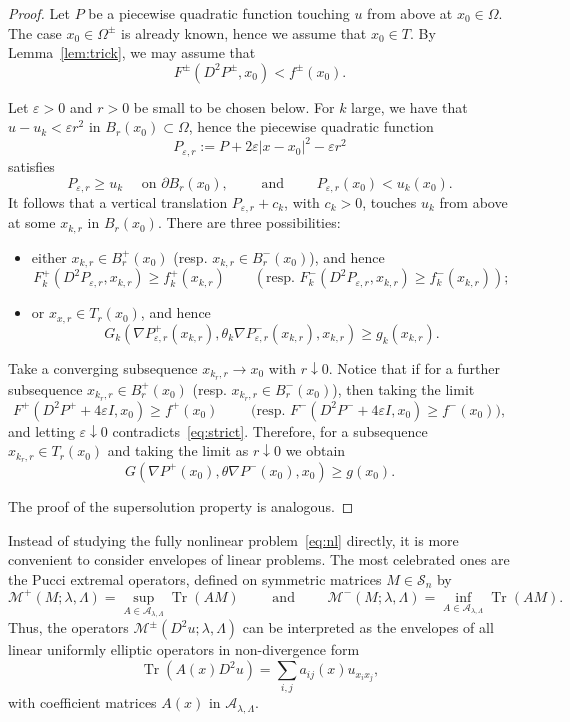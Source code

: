 \documentclass[letter,11pt]{amsart}
\newcommand{\vep}{\varepsilon}
\newcommand{\tr}[1]{\operatorname{Tr}(#1)}
\newcommand{\id}{I}
\newcommand{\ellmat}{\mathcal{A}_{\lambda, \Lambda}}
\newcommand{\mcal}{\mathcal{M}}
\newcommand{\scal}{\mathcal{S}}
\theoremstyle{definition}
\numberwithin{equation}{section}
\begin{document}
\begin{proof}
Let $P$ be a piecewise quadratic function touching $u$ from above at $x_0 \in \Omega$.
The case $x_0 \in \Omega^{\pm}$ is already known, hence we assume that $x_0 \in T$.
By Lemma~\ref{lem:trick}, we may assume that
\begin{equation}
\label{eq:strict}
F^{\pm}(D^2 P^{\pm}, x_0) < f^{\pm}(x_0).
\end{equation}

Let $\vep > 0$ and $r >0$ be small to be chosen below.
For $k$ large, we have that $u - u_k < \vep r^2$ in $B_r(x_0) \subset \Omega$, hence the piecewise quadratic function 
\[
P_{\vep, r} := P + 2 \vep |x-x_0|^2 - \vep r^2
\]
satisfies
\[
P_{\vep,r} \geq u_k \quad \text{ on } \partial B_r(x_0), \qquad \text{ and } \qquad P_{\vep, r}(x_0) < u_k(x_0).
\]
It follows that a vertical translation $P_{\vep,r} + c_k$, with $c_k > 0$, touches $u_k$ from above at some $x_{k,r}$ in $B_r(x_0)$.
There are three possibilities:
\begin{itemize}
\item either $x_{k,r} \in B_r^{+}(x_0)$ (resp. $x_{k,r} \in B_r^{-}(x_0)$), and hence
\[
F_{k}^{+} (D^2 P_{\vep, r}, x_{k,r}) \geq f_k^{+} (x_{k,r}) \qquad (\text{resp. } F_{k}^{-} (D^2 P_{\vep, r}, x_{k,r}) \geq f_k^{-} (x_{k,r}));
\]
\item or $x_{x,r} \in T_r(x_0)$, and hence
\[
G_k(\nabla P^{+}_{\vep,r}(x_{k,r}), \theta_k \nabla P^{-}_{\vep,r}(x_{k,r}), x_{k,r}) 
\geq g_k(x_{k,r}).
\]
\end{itemize}

Take a converging subsequence $x_{k_r,r} \to x_0$ with $r \downarrow 0$.
Notice that if for a further subsequence $x_{k_r,r} \in B_r^{+}(x_0)$ (resp. $x_{k_r,r} \in B_r^{-}(x_0)$), then taking the limit
\[
F^{+}(D^2 P^{+} + 4 \vep \id, x_0) \geq f^{+}(x_0) \qquad \text{ (resp. } F^{-}(D^2 P^{-} + 4 \vep \id, x_0) \geq f^{-}(x_0) ),
\]
and letting $\vep \downarrow 0$ contradicts~\eqref{eq:strict}.
Therefore, for a subsequence $x_{k_r,r} \in T_r(x_0)$ and taking the limit as $r \downarrow 0$ we obtain
\[
G(\nabla P^{+}(x_{0}), \theta \nabla P^{-}(x_{0}), x_{0}) \geq g(x_{0}).
\]

The proof of the supersolution property is analogous.
\end{proof}

\medskip

Instead of studying the fully nonlinear problem~\eqref{eq:nl} directly, it is more convenient to consider envelopes of linear problems.
The most celebrated ones are the Pucci extremal operators, defined on symmetric matrices $M \in \scal_n$ by
\[
\mcal^{+}(M; \lambda, \Lambda) = \sup_{A \in \ellmat}  \tr{A M} \qquad \text{ and } \qquad \mcal^{-}(M; \lambda, \Lambda) = \inf_{A \in \ellmat}  \tr{A M}.
\]
Thus, the operators $\mcal^{\pm}(D^2u; \lambda, \Lambda)$ can be interpreted as the envelopes of all linear uniformly elliptic operators in non-divergence form 
\[
\tr{A(x) D^2 u} = \sum_{i, j} a_{ij}(x) u_{x_i x_j},
\]
with coefficient matrices $A(x)$ in $\ellmat$.
\end{document}
